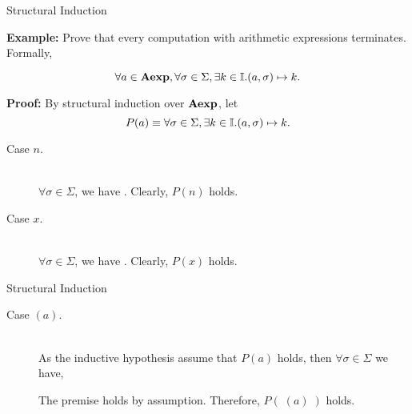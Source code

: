 \documentclass{beamer}
\begin{document}
\begin{frame}{Structural Induction}

\scriptsize

{\bf Example:} Prove that every computation with arithmetic expressions terminates. Formally,

\[
\forall a \in \syntaxset{Aexp},\forall \sigma\in\Sigma, \exists k\in\mathbb{I}.\pairmap{a}{\sigma}{k}.
\]

\vspace{.1in}

{\bf Proof:} By structural induction over $\syntaxset{Aexp}$, let
\[
P(a)\equiv \forall \sigma\in\Sigma,\exists k\in \mathbb{I}.\pairmap{a}{\sigma}{k}.
\]
\begin{description}
\item[Case $n$.]\hspace{.1in}\\
$\forall \sigma \in \Sigma$, we have .  Clearly, $P(n)$ holds.
\item[Case $x$.]\hspace{.1in}\\
$\forall \sigma \in \Sigma$, we have .  Clearly, $P(x)$ holds.
\end{description}
\end{frame}

\begin{frame}{Structural Induction}

\scriptsize

\begin{description}
\item[Case $(a)$.]\hspace{.1in}\\ 
As the inductive hypothesis assume that $P(a)$ holds, then $\forall \sigma \in \Sigma$ we have,
\begin{prooftree}
\end{prooftree}
The premise holds by assumption.  Therefore, $P(\;(a)\;)$ holds.
\end{description} 
\end{frame}
\end{document}
